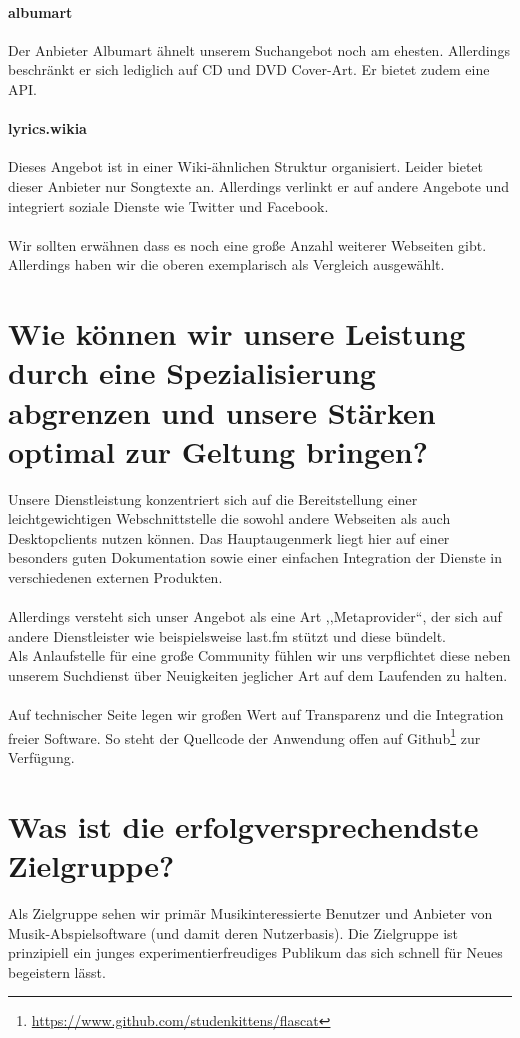 \paragraph{albumart}
Der Anbieter Albumart ähnelt unserem Suchangebot noch am ehesten. Allerdings
beschränkt er sich lediglich auf CD und DVD Cover-Art. Er bietet zudem eine API.

\paragraph{lyrics.wikia}
Dieses Angebot ist in einer Wiki-ähnlichen Struktur organisiert. Leider bietet
dieser Anbieter nur Songtexte an. Allerdings verlinkt er auf andere Angebote und
integriert soziale Dienste wie Twitter und Facebook.
\\
\\
Wir sollten erwähnen dass es noch eine große Anzahl weiterer Webseiten gibt.
Allerdings haben wir die oberen exemplarisch als Vergleich ausgewählt.

\section{Wie können wir unsere Leistung durch eine Spezialisierung abgrenzen und unsere Stärken optimal zur Geltung bringen?}
Unsere Dienstleistung konzentriert sich auf die Bereitstellung einer
leichtgewichtigen Webschnittstelle die sowohl andere Webseiten als auch
Desktopclients nutzen können. Das Hauptaugenmerk liegt hier auf einer besonders
guten Dokumentation sowie einer einfachen Integration der Dienste in
verschiedenen externen Produkten.
\\
\\
Allerdings versteht sich unser Angebot als eine Art ,,Metaprovider``, der sich
auf andere Dienstleister wie beispielsweise last.fm stützt und diese bündelt.
\\
Als Anlaufstelle für eine große Community fühlen wir uns verpflichtet diese
neben unserem Suchdienst über Neuigkeiten jeglicher Art auf dem Laufenden zu
halten.
\\
\\
Auf technischer Seite legen wir großen Wert auf Transparenz und die Integration
freier Software. So steht der Quellcode der Anwendung offen auf Github\footnote{\url{https://www.github.com/studenkittens/flascat}} zur
Verfügung. 



\section{Was ist die erfolgversprechendste Zielgruppe?}
Als Zielgruppe sehen wir primär Musikinteressierte Benutzer und Anbieter von
Musik-Abspielsoftware (und damit deren Nutzerbasis).
Die Zielgruppe ist prinzipiell ein junges experimentierfreudiges Publikum das
sich schnell für Neues begeistern lässt.


